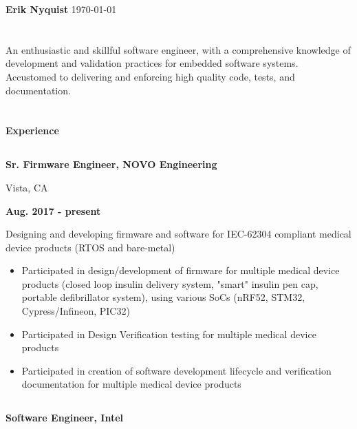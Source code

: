 \documentclass[6pt]{article}
\begin{document}
\begin{minipage}{35em}
%
%
{\Huge \bfseries Erik Nyquist}
{\hfill \today}
\section*{}
An enthusiastic and skillful software engineer, with a comprehensive knowledge of
development and validation practices for embedded software systems. Accustomed to
delivering and enforcing high quality code, tests, and documentation.
\hfill \break
\section*{}
{\Large \bfseries Experience}

\dotfill
%
%
\subsection*{}
\begin{minipage}{22em}
{\bfseries Sr. Firmware Engineer, NOVO Engineering

Vista, CA}
\end{minipage}
\hfill
\begin{minipage}{10em}
{\bfseries Aug. 2017 - present}
\end{minipage}
\break

Designing and developing firmware and software for IEC-62304 compliant medical
device products (RTOS and bare-metal)
\begin{itemize}
    \item Participated in design/development of firmware for multiple medical
          device products (closed loop insulin delivery system, "smart" insulin pen
          cap, portable defibrillator system), using various SoCs (nRF52, STM32,
          Cypress/Infineon, PIC32)
    \item Participated in Design Verification testing for multiple medical device products
    \item Participated in creation of software development lifecycle and
          verification documentation for multiple medical device products
\end{itemize}
\dotfill

%
%
\subsection*{}
\begin{minipage}{20em}
{\bfseries Software Engineer, Intel

}
\end{minipage}
\end{minipage}
\end{document}
